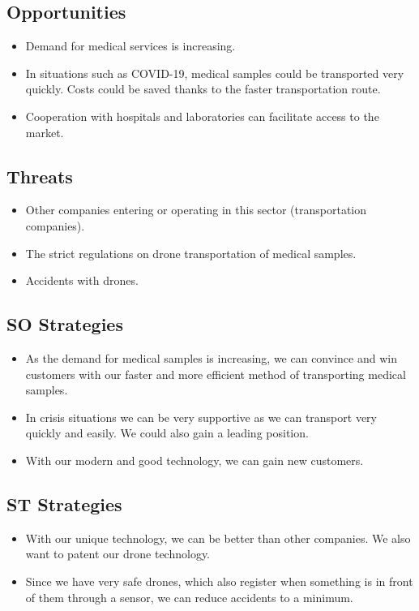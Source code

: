 \subsection{Opportunities}
\begin{itemize}
  \item Demand for medical services is increasing.
  \item In situations such as COVID-19, medical samples could be transported very quickly. Costs could be saved thanks to the faster transportation route.
  \item Cooperation with hospitals and laboratories can facilitate access to the market.
\end{itemize}
\subsection{Threats}
\begin{itemize}
  \item Other companies entering or operating in this sector (transportation companies).
  \item The strict regulations on drone transportation of medical samples.
  \item Accidents with drones.
\end{itemize}
\subsection{SO Strategies}
\begin{itemize}
  \item As the demand for medical samples is increasing, we can convince and win customers with our faster and more efficient method of transporting medical samples.
  \item In crisis situations we can be very supportive as we can transport very quickly and easily. We could also gain a leading position.
  \item With our modern and good technology, we can gain new customers.
\end{itemize}
\subsection{ST Strategies}
\begin{itemize}
  \item With our unique technology, we can be better than other companies. We also want to patent our drone technology.
  \item Since we have very safe drones, which also register when something is in front of them through a sensor, we can reduce accidents to a minimum.
\end{itemize}
